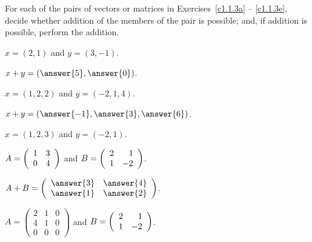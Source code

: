 \documentclass{ximera}
\begin{document}
\noindent For each of the pairs of vectors or matrices in
Exercises~\ref{c1.1.3a} -- \ref{c1.1.3e}, decide whether addition
of the members of the pair is possible; and, if addition is possible,
perform the addition.
\begin{exercise} %
  $x=(2,1)$ and $y=(3,-1)$.
  \begin{multipleChoice}
  \end{multipleChoice}
  \begin{exercise}
    $x + y = (\answer{5},\answer{0})$.
  \end{exercise}
\end{exercise}

\begin{exercise} \label{c1.1.3b}
  $x=(1,2,2)$ and $y=(-2,1,4)$.
  \begin{multipleChoice}
  \end{multipleChoice}
  \begin{exercise}
    $x + y = (\answer{-1},\answer{3},\answer{6})$.
  \end{exercise}
\end{exercise}

\begin{exercise} \label{c1.1.3c}
  $x=(1,2,3)$ and $y=(-2,1)$.
  \begin{multipleChoice}
  \end{multipleChoice}  
\end{exercise}

\begin{exercise} \label{c1.1.3d}
  $A=\left(\begin{array}{rr} 1 & 3\\ 0 &4\end{array}\right)$ and $B=\left(\begin{array}{rr} 2 & 1\\ 1 &-2\end{array}\right)$.
  \begin{multipleChoice}
  \end{multipleChoice}
  \begin{exercise}
    $A + B = \mattwo{\answer{3}}{\answer{4}}{\answer{1}}{\answer{2}}$.
  \end{exercise}
\end{exercise}

\begin{exercise} \label{c1.1.3e}
$A=\left(\begin{array}{rrr} 2 & 1 & 0\\ 4 & 1 & 0\\
           0 & 0 & 0\end{array}\right)$ and $B=\left(\begin{array}{rr} 2 & 1\\ 1 &-2\end{array}\right)$.
  \begin{multipleChoice}
  \end{multipleChoice}         
\end{exercise}
\end{document}
